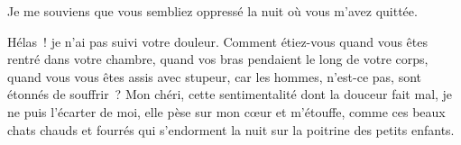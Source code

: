 {Je me souviens que vous sembliez oppressé la nuit où vous m'avez
quittée.

Hélas~! je n'ai pas suivi votre douleur. Comment étiez-vous quand vous
êtes rentré dans votre chambre, quand vos bras pendaient le long de
votre corps, quand vous vous êtes assis avec stupeur, car les hommes,
n'est-ce pas, sont étonnés de souffrir~? Mon chéri, cette
sentimentalité dont la douceur fait mal, je ne puis l'écarter de moi,
elle pèse sur mon cœur et m'étouffe, comme ces beaux chats chauds et
fourrés qui s'endorment la nuit sur la poitrine des petits enfants.
}


